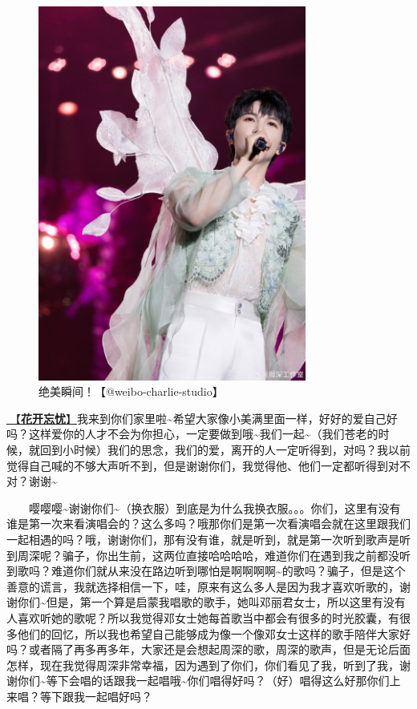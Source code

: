 \documentclass[]{ctexbook}
\begin{document}
\begin{figure}

{\centering \includegraphics[width=250pt]{img/hangzhou20240823/001} 

}

\caption{绝美瞬间！【@weibo-charlie-studio】}\label{fig:unnamed-chunk-75}
\end{figure}

\hyperref[no-worries]{🎵【\textbf{花开忘忧}】}我来到你们家里啦\textasciitilde 希望大家像小美满里面一样，好好的爱自己好吗？这样爱你的人才不会为你担心，一定要做到哦\textasciitilde 我们一起\textasciitilde（我们苍老的时候，就回到小时候）我们的思念，我们的爱，离开的人一定听得到，对吗？我以前觉得自己喊的不够大声听不到，但是谢谢你们，我觉得他、他们一定都听得到对不对？谢谢\textasciitilde{}

  嘤嘤嘤\textasciitilde 谢谢你们\textasciitilde（换衣服）到底是为什么我换衣服。。。你们，这里有没有谁是第一次来看演唱会的？这么多吗？哦那你们是第一次看演唱会就在这里跟我们一起相遇的吗？哦，谢谢你们，那有没有谁，就是听到，就是第一次听到歌声是听到周深呢？骗子，你出生前，这两位直接哈哈哈哈，难道你们在遇到我之前都没听到歌吗？难道你们就从来没在路边听到哪怕是啊啊啊啊\textasciitilde 的歌吗？骗子，但是这个善意的谎言，我就选择相信一下，哇，原来有这么多人是因为我才喜欢听歌的，谢谢你们\textasciitilde 但是，第一个算是启蒙我唱歌的歌手，她叫邓丽君女士，所以这里有没有人喜欢听她的歌呢？所以我觉得邓女士她每首歌当中都会有很多的时光胶囊，有很多他们的回忆，所以我也希望自己能够成为像一个像邓女士这样的歌手陪伴大家好吗？或者隔了再多再多年，大家还是会想起周深的歌，周深的歌声，但是无论后面怎样，现在我觉得周深非常幸福，因为遇到了你们，你们看见了我，听到了我，谢谢你们\textasciitilde 等下会唱的话跟我一起唱哦\textasciitilde 你们唱得好吗？（好）唱得这么好那你们上来唱？等下跟我一起唱好吗？
\end{document}
